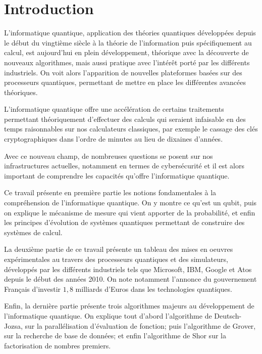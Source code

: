 \chapter{Introduction}

L'informatique quantique, application des théories quantiques développées depuis le début du vingtième siècle à la théorie de l'information puis spécifiquement au calcul, est aujourd'hui en plein développement, théorique avec la découverte de nouveaux algorithmes, mais aussi pratique avec l'intérêt porté par les différents industriels. On voit alors l'apparition de nouvelles plateformes basées sur des processeurs quantiques, permettant de mettre en place les différentes avancées théoriques.

L'informatique quantique offre une accélération de certains traitements permettant théoriquement d'effectuer des calculs qui seraient infaisable en des temps raisonnables sur nos calculateurs classiques, par exemple le cassage des clés cryptographiques dans l'ordre de minutes au lieu de dixaines d'années.

Avec ce nouveau champ, de nombreuses questions se posent sur nos infrastructures actuelles, notamment en termes de cybersécurité et il est alors important de comprendre les capacités qu'offre l'informatique quantique.

Ce travail présente en première partie les notions fondamentales à la compréhension de l'informatique quantique. On y montre ce qu'est un qubit, puis on explique le mécanisme de mesure qui vient apporter de la probabilité, et enfin les principes d'évolution de systèmes quantiques permettant de construire des systèmes de calcul.

La deuxième partie de ce travail présente un tableau des mises en oeuvres expérimentales au travers des processeurs quantiques et des simulateurs, développés par les différents industriels tels que Microsoft, IBM, Google et Atos depuis le début des années 2010. On note notamment l'annonce du gouvernement Français d'investir $1,8$ milliards d'Euros dans les technologies quantiques.

Enfin, la dernière partie présente trois algorithmes majeurs au développement de l'informatique quantique. On explique tout d'abord l'algorithme de Deutsch-Jozsa, sur la parallélisation d'évaluation de fonction; puis l'algorithme de Grover, sur la recherche de base de données; et enfin l'algorithme de Shor sur la factorisation de nombres premiers.